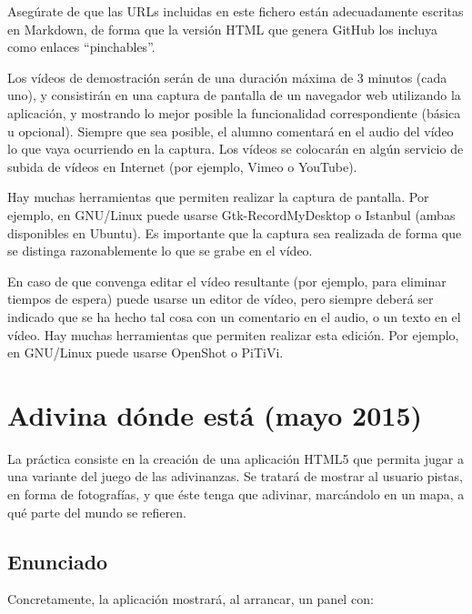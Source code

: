 Asegúrate de que las URLs incluidas en este fichero están adecuadamente escritas en Markdown, de forma que la versión HTML que genera GitHub los incluya como enlaces ``pinchables''.

Los vídeos de demostración serán de una duración máxima de 3 minutos (cada uno), y consistirán en una captura de pantalla de un navegador web utilizando la aplicación, y mostrando lo mejor posible la funcionalidad correspondiente (básica u opcional). Siempre que sea posible, el alumno comentará en el audio del vídeo lo que vaya ocurriendo en la captura. Los vídeos se colocarán en algún servicio de subida de vídeos en Internet (por ejemplo, Vimeo o YouTube).

Hay muchas herramientas que permiten realizar la captura de pantalla. Por ejemplo, en GNU/Linux puede usarse Gtk-RecordMyDesktop o Istanbul (ambas disponibles en Ubuntu). Es importante que la captura sea realizada de forma que se distinga razonablemente lo que se grabe en el vídeo.

En caso de que convenga editar el vídeo resultante (por ejemplo, para eliminar tiempos de espera) puede usarse un editor de vídeo, pero siempre deberá ser indicado que se ha hecho tal cosa con un comentario en el audio, o un texto en el vídeo. Hay muchas herramientas que permiten realizar esta edición. Por ejemplo, en GNU/Linux puede usarse OpenShot o PiTiVi.


\section{Adivina dónde está (mayo 2015)}

\label{sec:final-15-mayo}

La práctica consiste en la creación de una aplicación HTML5 que permita jugar a una variante del juego de las adivinanzas. Se tratará de mostrar al usuario pistas, en forma de fotografías, y que éste tenga que adivinar, marcándolo en un mapa, a qué parte del mundo se refieren.

\subsection{Enunciado}

Concretamente, la aplicación mostrará, al arrancar, un panel con:

